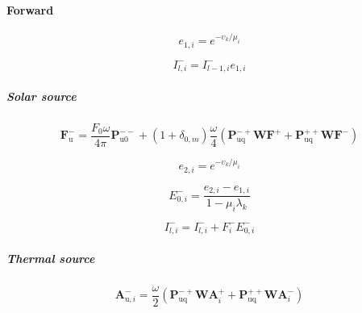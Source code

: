 \paragraph{Forward}
\label{sec:source_function_integration-local_source_classical-downward-forward}

\begin{equation}
e_{1,i} = e^{-\upsilon_{k} / \mu_{i}}
\label{eq:source_function_integration-local_source_classical-upward-forward-e_1_i}
\end{equation}

\begin{equation}
I^{-}_{l,i} = I^{-}_{l-1,i} e_{1,i}
\label{eq:source_function_integration-local_source_classical-upward-forward-I_p_l_i_1}
\end{equation}


\subparagraph{Solar source}
\label{sec:source_function_integration-local_source_classical-downward-forward-solar_source}

\begin{equation}
\mathbf{F}^{-}_{\mathrm{u}} = \frac{F_{0}\omega}{4\pi}\mathbf{P}^{--}_{\mathrm{u0}} + (1 + \delta_{0,m}) \frac{\omega}{4}(\mathbf{P}^{-+}_{\mathrm{uq}}\mathbf{W}\mathbf{F}^{+} + \mathbf{P}^{++}_{\mathrm{uq}}\mathbf{W}\mathbf{F}^{-})
\label{eq:source_function_integration-local_source_classical-upward-forward-solar_source-F_p_u}
\end{equation}

\begin{equation}
e_{2,i} = e^{-\upsilon_{k} / \mu_{i}}
\label{eq:source_function_integration-local_source_classical-upward-forward-solar_source-e_2_i}
\end{equation}

\begin{equation}
E^{-}_{0,i} = \frac{e_{2,i} - e_{1,i}}{1 - \mu_{i} \lambda_{k}} 
\label{eq:source_function_integration-local_source_classical-upward-forward-solar_source-E_p_0_i}
\end{equation}

\begin{equation}
I^{-}_{l,i} = I^{-}_{l,i} + F^{-}_{i} E^{-}_{0,i}
\label{eq:source_function_integration-local_source_classical-upward-forward-solar_source-I_p_l_i_1}
\end{equation}


\subparagraph{Thermal source}
\label{sec:source_function_integration-local_source_classical-downward-forward-thermal_source}

\begin{equation}
\mathbf{A}^{-}_{\mathrm{u},i} = \frac{\omega}{2}(\mathbf{P}^{-+}_{\mathrm{uq}}\mathbf{W}\mathbf{A}^{+}_{i} + \mathbf{P}^{++}_{\mathrm{uq}}\mathbf{W}\mathbf{A}^{-}_{i})
\label{eq:source_function_integration-local_source_classical-upward-forward-thermal_source-A_p_u_i}
\end{equation}

